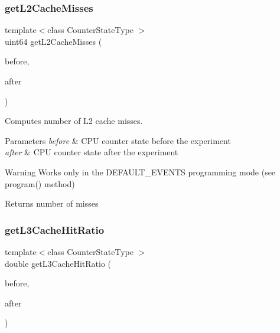 \subsubsection{\texorpdfstring{get\+L2\+Cache\+Misses}{getL2CacheMisses}}
{\footnotesize\ttfamily template$<$class Counter\+State\+Type $>$ \\
uint64 get\+L2\+Cache\+Misses (\begin{DoxyParamCaption}\item[{const Counter\+State\+Type \&}]{before,  }\item[{const Counter\+State\+Type \&}]{after }\end{DoxyParamCaption})\hspace{0.3cm}{\ttfamily [friend]}}



Computes number of L2 cache misses. 


\begin{DoxyParams}{Parameters}
{\em before} & C\+PU counter state before the experiment \\
\hline
{\em after} & C\+PU counter state after the experiment \\
\hline
\end{DoxyParams}
\begin{DoxyWarning}{Warning}
Works only in the D\+E\+F\+A\+U\+L\+T\+\_\+\+E\+V\+E\+N\+TS programming mode (see program() method) 
\end{DoxyWarning}
\begin{DoxyReturn}{Returns}
number of misses 
\end{DoxyReturn}
\mbox{\label{class_basic_counter_state_a7b03f0cd02862716d717e897032b7885}} 
\subsubsection{\texorpdfstring{get\+L3\+Cache\+Hit\+Ratio}{getL3CacheHitRatio}}
{\footnotesize\ttfamily template$<$class Counter\+State\+Type $>$ \\
double get\+L3\+Cache\+Hit\+Ratio (\begin{DoxyParamCaption}\item[{const Counter\+State\+Type \&}]{before,  }\item[{const Counter\+State\+Type \&}]{after }\end{DoxyParamCaption})\hspace{0.3cm}{\ttfamily [friend]}}



